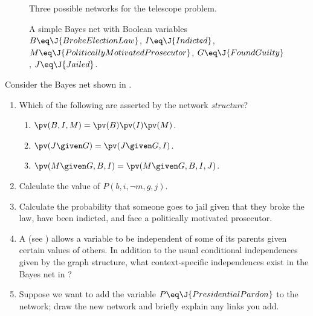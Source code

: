 \begin{figure}[tbp]
\caption{Three possible networks for the telescope problem.}
\label{telescope-nets-figure}
\end{figure} 

\begin{figure}[h]
\caption{A simple Bayes net with
Boolean variables \(B\eq \J{BrokeElectionLaw}\), \(I\eq \J{Indicted}\), 
\(M\eq \J{PoliticallyMotivatedProsecutor}\), \(G\eq \J{FoundGuilty}\), 
\(J\eq \J{Jailed}\).}
\label{politics-figure}
\end{figure} 

\begin{uexercise}
Consider the Bayes net shown in .
\begin{enumerate}
\item Which of the following are asserted by the network {\em structure}?
\begin{enumerate}
\item \(\pv(B,I,M) = \pv(B)\pv(I)\pv(M)\).
\item \(\pv(J\given G) = \pv(J\given G,I)\).
\item \(\pv(M\given G,B,I) = \pv(M\given G,B,I,J)\).
\end{enumerate}
\item Calculate the value of \(P(b,i,\lnot m,g,j)\).
\item Calculate the probability that someone goes to jail given that they
broke the law, have been indicted, and face a politically motivated prosecutor.
\item A  (see )
allows a variable to be independent of some of its parents given certain values of others. In addition to the usual
conditional independences given by the graph structure, what context-specific independences
exist in the Bayes net in ?
\item Suppose we want to add the variable \(P\eq \J{PresidentialPardon}\)
to the network; draw the new network and 
briefly explain any links you add.
\end{enumerate}
\end{uexercise} 

